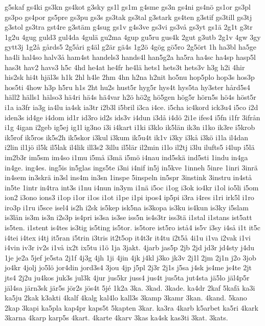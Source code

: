 {g5skaf
gs4ki
gs3kn
gs4kot
g3sky
gs1l
gs1m
g4sme
gs3n
gs4ni
gs4nö
gs1or
gs3pl
gs3po
gs4por
gs5pre
gs3pu
gs3s
gs3tak
gs3tal
g3stark
gs4ten
g3stif
gs3till
gs3tj
g3stol
gs3tra
gst4re
g3stäm
g4sug
gs1v
g4s3ve
gs3vi
gs3vå
gs3yt
gs1ä
2g1t
g3tr
1g2u
4gug
guld3
gul4da
4gulä
gu2ma
4gup
gu5ru
gus4k
2gut
g3utb
2g1v
4gw
3gy
gytt3j
1g2å
gårds5
2g5åri
g4äl
g2är
gä4s
1g2ö
4gög
gö5ro
2g5ört
1h
ha3bl
ha5ge
ha4li
hal4so
halv3å
ham4st
handels3
hands4l
han5g2a
ha5ra
ha4sc
ha4sp
hasp5l
has3t
hav2
havs3
h5c
4hd
he4at
he4fr
he4lä
hets1
hets3t
hets3v
h3g
h2i
4hir
his2sk
hi4t
hjäl3s
h1k
2hl
h4le
2hm
4hn
h2na
h2nit
ho5nu
hop5plo
hop3s
hos3p
hos5ti
4how
h3p
h5ru
h1s
2ht
hu2s
hust5r
hyg5r
hys4t
hys5ta
hy3ster
hård5s4
häll2
hälls1
hälso3
hä4ri
hä4s
hä4var
h2ö
hö2g
hö5gen
hög5r
hörn5s
hö4s
höst5r
i1a
ia3fr
ia3g
ia4lu
ia4sk
ia3tr
i2b3l
i5bril
i3ca
i4ce.
i5cha
ic4kord
ick3u4
i5co
i2d
iden3s
id4ge
i4dom
id1r
id3ro
id2s
ids3v
i4dun
i3då
i4dö
2i1e
ifes4
i5fn
i1fr
3ifrån
i1g
4igan
i2geb
ig5ej
ig1l
ig3no
i3i
i4kart
i1ki
i3klo
ik5län
ik3n
i1ko
ik3re
i5krob
ik5rof
ik5ros
ik5s2h
ik5skor
i3kul
i3kum
ik5u4t
ik1v
i3ky
i3kå
i3kö
i1la
il4dan
i2lin
il1jö
il5k
il5lak
il4lik
ill3s2
3illu
il5lär
il2min
i1lo
il2tj
i3lu
ilufts5
i4lup
i5lä
im2b3r
im5sm
im4so
i1mu
i5må
i3mä
i5mö
i4nau
ind5skä
ind5sti
1indu
in4ga
in4ge.
ing4es.
ing5is
in5glas
ings5te
i3ni
i4nif
in5j
in5kve
1inneh
5inre
1inri
3inrä
in4sem
in3skrä
in3sl
ins4m
in3sn
1inspe
5inspeln
in5spr
3instink
3instru
in4stå
in5te
1intr
in4tra
int3s
i1nu
i4nun
in3ym
i1nä
i5oc
i1og
i3ok
io4kr
i1ol
io5li
i5om
ion2
i3ono
ions3
i1op
i1or
i1os
i1ot
i1pe
i1pi
ipos4
ip5pi
i3ra
i4res
i1ri
irk5l
i1ro
iro3p
i1ru
i5sce
isel4
is2h
i2sk
is5kep
isk5na
is3kopa
is3ku
is4kun
is3ky
i5slam
is3län
is3m
is3n
i2s3p
is4pri
is3sa
is3se
iss5n
is4s3tr
iss3tä
i1stal
i1stans
ist5att
is5ten.
i1stent
is4tes
is3tig
is5ting
is5tor.
is5tore
ist5ro
istå4
is5v
i3sy
i4så
i1t
it5c
i4tei
i4tex
i4tj
it5ran
i5trin
i3tris
it2t5op
it4t3r
it4tu
i2t5å
4i1u
i1va
i2vak
i1vi
i4vin
iv3r
iv2s
i1vå
ix2t
ix5tu
i1ö
1ja
3jakt.
4jarb
jas5p
2jb
2jd
jd3r
jd4sty
j4du
1je
je2a
5jef
je5sta
2j1f
4j3g
4jh
1ji
4jin
4jk
j4kl
j3ko
jk3v
2j1l
2jm
2j1n
j2o
3job
jo4kr
4jolj
jo5lö
jor4din
jord3s4
3jou
4jp
j5pl
2j3r
2j1s
j5sa
j4sk
js4me
js4te
2jt
jts4
2j2u
ju4kos
juk3s
jul3k
4jur
jus5kr
juss4
jus4t
jus5ta
jut4sta
jä5lo
jäl4p5r
jäl4sa
järn3sk
jär5s
jör2s
jös4t
5jé
1k2a
3ka.
3kad.
3kade.
ka4dr
2kaf
5kafä
ka3i
ka5ju
2kak
k3akti
4kalf
4kalg
kal4lo
kall3s
3kamp
3kamr
3kan.
4kand.
5kano
2kap
3kapi
ka5pla
kap4pr
kaps5t
5kapten
3kar.
ka3ra
4karb
k5arbet
ka5ri
4kark
3karna
4karp
karp5s
4kart.
4karte
4karv
3kas
ka4sk
kas3ti
3kat.
3kats.
}
